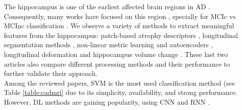 The hippocampus is one of the earliest affected brain regions in AD \cite{Ballard2011}. Consequently, many works have focused on this region \cite{chincarini,Shi2017}, specially for MCIc vs MCInc classification \cite{Fiot2014,Sanroma2017}. We observe a variety of methods to extract meaningful features from the hippocampus: patch-based atrophy descriptors \cite{Sanroma2017}, longitudinal segmentation methods \cite{Platero2019}, non-linear metric learning and autoencoders \cite{Shi2017}, longitudinal deformation \cite{Fiot2012,Fiot2014} and hippocampus volume change \cite{chincarini}. These last two articles also compare different processing methods and their performance to further validate their approach. \\ 

Among the reviewed papers, SVM is the most used classification method (see Table \ref{table:cadmri} due to its simplicity, availability, and strong performance. However, DL methods are gaining popularity, using CNN \cite{Ortiz2017} and RNN \cite{Ghazi2019,Cui2018}. \\

